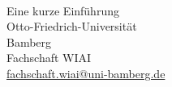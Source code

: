 \begin{titlepage}
\begin{center}
\vspace*{20mm}{\Huge \LaTeX}\\
\vspace{5mm} {\LARGE Eine kurze Einf\"uhrung}\\
\vspace{12mm} {\LARGE Otto-Friedrich-Universit\"at\\ Bamberg}\\
\vspace{24mm} {Fachschaft WIAI\\ \href{mailto: fachschaft.wiai@uni-bamberg.de}{fachschaft.wiai@uni-bamberg.de}}\\
\end{center}
\end{titlepage}